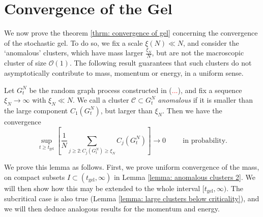 \section{Convergence of the Gel} 
We now prove the theorem \ref{thrm: convergence of gel} concerning the convergence of the stochastic gel. To do so, we fix a scale $\xi(N)\ll N$, and consider the `anomalous' clusters, which have mass larger $\frac{\xi_N}{N}$, but are not the macroscopic cluster of size $\mathcal{O}(1)$. The following result guarantees that such clusters do not asymptotically contribute to mass, momentum or energy, in a uniform sense.
\begin{lemma} \label{lemma: anomalous clusters} Let $G^N_t$ be the random graph process constructed in (\textcolor{red}{...}), and fix a sequence $\xi_N\rightarrow \infty$ with $\xi_N\ll N$. We call a cluster $\mathcal{C}\subset G^N_t$ \emph{anomalous} if it is smaller than the large component $C_1(G^N_t)$, but larger than $\xi_N.$ Then we have the convergence \begin{equation}
       \sup_{t \geq t_\text{gel}}\left[\frac{1}{N}\sum_{j\geq 2: C_j(G^N_t)\geq \xi_N} C_j(G^N_t)\right] \rightarrow 0 \hspace{1cm}\text{in probability.}\end{equation} 
        \end{lemma} 
       
       We prove this lemma as follows. First, we prove uniform convergence of the mass, on compact subsets $I\subset (t_\text{gel}, \infty)$ in Lemma \ref{lemma: anomalous clusters 2}. We will then show how this may be extended to the whole interval $[t_\text{gel}, \infty)$. The subcritical case is also true (Lemma \ref{lemma: large clusters below criticality}), and we will then deduce analogous results for the momentum and energy.
       

